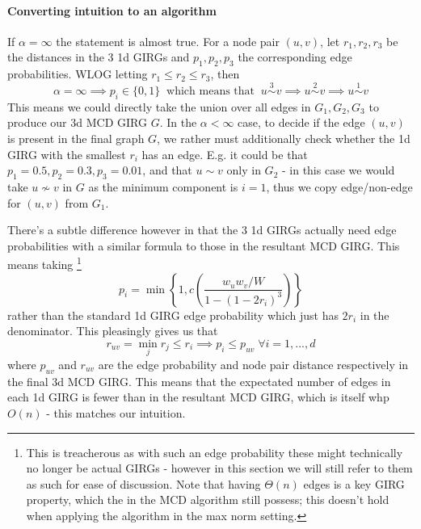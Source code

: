 \paragraph{Converting intuition to an algorithm}
If $\alpha=\infty$ the  statement is almost true.
For a node pair $(u,v)$, let $r_1, r_2, r_3$ be the distances in the $3$ 1d GIRGs and $p_1, p_2, p_3$ the corresponding edge probabilities. WLOG letting $r_1 \leq r_2 \leq r_3$, then
\begin{equation}
    \alpha = \infty \implies p_i \in \{0, 1\} \;\; \text{which means that} \;\; u \stackrel{3}{\sim} v \implies u \stackrel{2}{\sim} v \implies u \stackrel{1}{\sim} v
\end{equation}
This means we could directly take the union over all edges in $G_1, G_2, G_3$ to produce our 3d MCD GIRG $G$.
In the $\alpha < \infty$ case, to decide if the edge $(u,v)$ is present in the final graph $G$, we rather must additionally check whether the 1d GIRG with the smallest $r_i$ has an edge. E.g. it could be that $p_1 = 0.5, p_2 = 0.3, p_3 = 0.01$, and that $u \sim v$ only in $G_2$ - in this case we would take $u \not \sim v$ in $G$ as the minimum component is $i=1$, thus we copy edge/non-edge for $(u, v)$ from $G_1$. 

There's a subtle difference however in that the $3$ 1d GIRGs actually need edge probabilities with a similar formula to those in the resultant MCD GIRG. This means taking
\footnote{This is treacherous as with such an edge probability these  might technically no longer be actual GIRGs - however in this section we will still refer to them as such for ease of discussion. Note that having $\Theta(n)$ edges is a key GIRG property, which the  in the MCD algorithm still possess; this doesn't hold when applying the algorithm in the max norm setting.}
\begin{equation}
    p_i = \min \left \{
        1, c \left ( 
            \frac{w_u w_v / W}{1 - (1 - 2 r_i)^3}
        \right )     
    \right \}
\end{equation}
rather than the standard 1d GIRG edge probability which just has $2 r_i$ in the denominator. 
This pleasingly gives us that
\begin{equation}
    r_{uv} = \min_j r_j \leq r_i \implies p_i \leq p_{uv} \; \forall i=1,...,d
\end{equation}
where $p_{uv}$ and $r_{uv}$ are the edge probability and node pair distance respectively in the final 3d MCD GIRG. This means that the expectated number of edges in each 1d GIRG is fewer than in the resultant MCD GIRG, which is itself whp $O(n)$ - this matches our  intuition.

